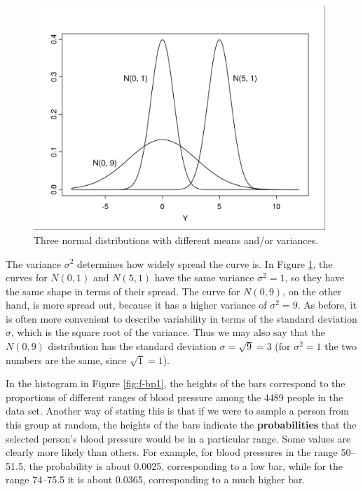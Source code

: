 \documentclass[11pt,a4paper,openany]{book}
\begin{document}
\begin{figure}[htbp]
\centering
\includegraphics[width=11.00000cm]{threenorms.pdf}
\caption{\label{fig:f-3norms} Three normal distributions with different
means and/or variances.}
\end{figure}

The variance \(\sigma^{2}\) determines how widely spread the curve is.
In Figure \ref{fig:f-3norms}, the curves for \(N(0, 1)\) and \(N(5, 1)\)
have the same variance \(\sigma^{2}=1\), so they have the same shape in
terms of their spread. The curve for \(N(0, 9)\), on the other hand, is
more spread out, because it has a higher variance of \(\sigma^{2}=9\).
As before, it is often more convenient to describe variability in terms
of the standard deviation \(\sigma\), which is the square root of the
variance. Thus we may also say that the \(N(0, 9)\) distribution has the
standard deviation \(\sigma=\sqrt{9}=3\) (for \(\sigma^{2}=1\) the two
numbers are the same, since \(\sqrt{1}=1\)).

In the histogram in Figure \ref{fig:f-bp1}, the heights of the bars
correspond to the proportions of different ranges of blood pressure
among the 4489 people in the data set. Another way of stating this is
that if we were to sample a person from this group at random, the
heights of the bars indicate the \textbf{probabilities} that the
selected person's blood pressure would be in a particular range. Some
values are clearly more likely than others. For example, for blood
pressures in the range 50--51.5, the probability is about 0.0025,
corresponding to a low bar, while for the range 74--75.5 it is about
0.0365, corresponding to a much higher bar.
\end{document}
